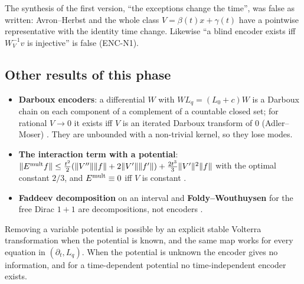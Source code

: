\begin{caution}[title=An earlier claim that turned out false]
The synthesis of the first version, ``the exceptions change the time'', was false as written: Avron--Herbst and the whole class $V=\beta(t)x+\gamma(t)$ have a pointwise representative with the identity time change. Likewise ``a blind encoder exists iff $W_V^{-1}v$ is injective'' is false (ENC-N1).
\end{caution}

\subsection{Other results of this phase}

\begin{itemize}
\item \textbf{Darboux encoders}: a differential $W$ with $WL_q=(L_0+c)W$ is a Darboux chain on each component of a complement of a countable closed set; for rational $V\to0$ it exists iff $V$ is an iterated Darboux transform of $0$ (Adler--Moser) . They are unbounded with a non-trivial kernel, so they lose modes.
\item \textbf{The interaction term with a potential}: $\|E^{\rm mult}f\|\le\frac{t^2}2(\|V''\|\|f\|+2\|V'\|\|f'\|)+\frac{2t^3}3\|V'\|^2\|f\|$ with the optimal constant $2/3$, and $E^{\rm mult}\equiv0$ iff $V$ is constant .
\item \textbf{Faddeev decomposition} on an interval and \textbf{Foldy--Wouthuysen} for the free Dirac $1+1$ are decompositions, not encoders .
\end{itemize}

\begin{takeaway}
Removing a variable potential is possible by an explicit stable Volterra transformation when the potential is known, and the same map works for every equation in $(\partial_t,L_q)$. When the potential is unknown the encoder gives no information, and for a time-dependent potential no time-independent encoder exists.
\end{takeaway}
